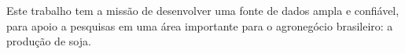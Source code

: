Este trabalho tem a missão de desenvolver uma fonte de dados ampla e confiável, para apoio a pesquisas em uma área importante para o agronegócio brasileiro: a produção de soja.














